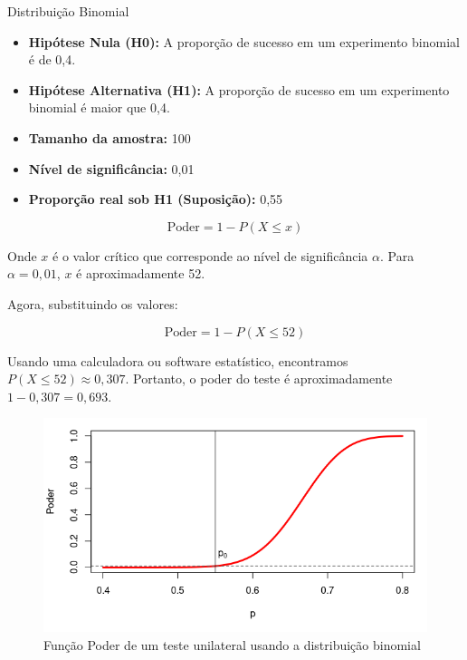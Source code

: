 \documentclass[12pt]{beamer}
\begin{document}
\begin{frame}{}
\begin{block}{Distribuição Binomial}
\justifying
\begin{itemize}
\item \textbf{Hipótese Nula (H0):} A proporção de sucesso em um experimento binomial é de 0,4.
\item \textbf{Hipótese Alternativa (H1):} A proporção de sucesso em um experimento binomial é maior que 0,4.
\item \textbf{Tamanho da amostra:} 100
\item \textbf{Nível de significância:} 0,01
\item \textbf{Proporção real sob H1 (Suposição):} 0,55
\end{itemize}

\[ \text{Poder} = 1 - P(X \leq x) \]

Onde $x$ é o valor crítico que corresponde ao nível de significância $\alpha$. Para $\alpha = 0,01$, $x$ é aproximadamente 52.
\end{block}
\end{frame}

\begin{frame}{}
\begin{block}{}
\justifying
Agora, substituindo os valores:

\[ \text{Poder} = 1 - P(X \leq 52) \]

Usando uma calculadora ou software estatístico, encontramos $P(X \leq 52) \approx 0,307$. Portanto, o poder do teste é aproximadamente $1 - 0,307 = 0,693$.
\end{block}
\end{frame}

\begin{frame}{}
\begin{block}{}
\justifying
\begin{figure}
    \centering
    \includegraphics[scale=0.7]{figs/binomPower.png}
    \caption{Função Poder de um teste unilateral usando a distribuição binomial}
    \label{fig:enter-label}
\end{figure}
\end{block}
\end{frame}
\end{document}
